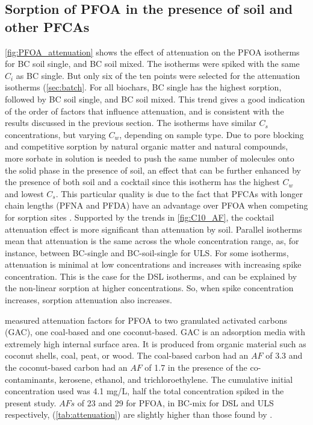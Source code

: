 \subsection{Sorption of PFOA in the presence of soil and other PFCAs}
\cref{fig:PFOA_attenuation} shows the effect of attenuation on the PFOA isotherms for BC soil single, and BC soil mixed. The isotherms were spiked with the same $C_i$ as BC single. But only six of the ten points were selected for the attenuation isotherms (\cref{sec:batch}. For all biochars, BC single has the highest sorption, followed by BC soil single, and BC soil mixed. This trend gives a good indication of the order of factors that influence attenuation, and is consistent with the results discussed in the previous section. The isotherms have similar $C_s$ concentrations, but varying $C_w$, depending on sample type. Due to pore blocking and competitive sorption by natural organic matter and natural compounds, more sorbate in solution is needed to push the same number of molecules onto the solid phase in the presence of soil, an effect that can be further enhanced by the presence of both soil and a cocktail since this isotherm has the highest $C_w$ and lowest $C_s$. This particular quality is due to the fact that PFCAs with longer chain lengths (PFNA and PFDA) have an advantage over PFOA when competing for sorption sites \citep{Sormo2021}. Supported by the trends in \cref{fig:C10_AF}, the cocktail attenuation effect is more significant than attenuation by soil. Parallel isotherms mean that attenuation is the same across the whole concentration range, as, for instance, between BC-single and BC-soil-single for ULS. For some isotherms, attenuation is minimal at low concentrations and increases with increasing spike concentration. This is the case for the DSL isotherms, and can be explained by the non-linear sorption at higher concentrations. So, when spike concentration increases, sorption attenuation also increases. 

\cite{siriwardena2019influence} measured attenuation factors for PFOA to two granulated activated carbons (GAC), one coal-based and one coconut-based. GAC is an adsorption media with extremely high internal surface area. It is produced from organic material such as coconut shells, coal, peat, or wood. The coal-based carbon had an $AF$ of 3.3 and the coconut-based carbon had an $AF$ of 1.7 in the presence of the co-contaminants, kerosene, ethanol, and trichloroethylene. The cumulative initial concentration used was 4.1 mg/L, half the total concentration spiked in the present study. $AFs$ of 23 and 29 for PFOA, in BC-mix for DSL and ULS respectively, (\cref{tab:attenuation}) are slightly higher than those found by \cite{siriwardena2019influence}. 


